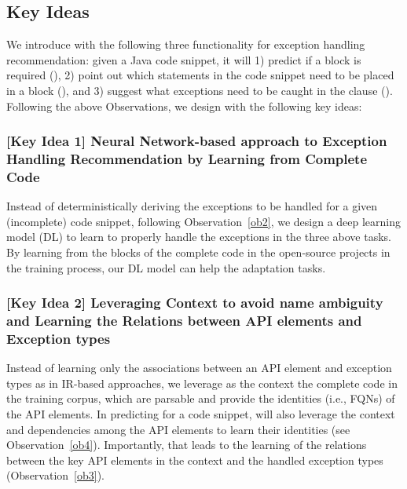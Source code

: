 \subsection{Key Ideas}
\label{key:sec}

We introduce {\tool} with the following three functionality for
exception handling recommendation: given a Java code snippet, it will
1) predict if a  block is required ({\xblock}), 2)
point out which statements in the code snippet need to be placed in a
 block ({\xstate}), and 3) suggest what exceptions
need to be caught in the  clause ({\xtype}). Following the
above Observations, we design {\tool} with the following key ideas:



\subsubsection{{\bf [Key Idea 1] Neural Network-based approach to Exception Handling Recommendation by Learning from Complete Code}}
Instead of deterministically deriving the exceptions to be handled for
a given (incomplete) code snippet, following Observation~\ref{ob2}, we
design a deep learning model (DL) to learn to properly handle the
exceptions in the three above tasks.
By learning from the  blocks of the complete code in
the open-source projects in the training process, our DL model can
help the adaptation tasks.




\vspace{2pt}
\subsubsection{{\bf [Key Idea 2] Leveraging Context to avoid
name ambiguity and Learning the Relations between API elements and
Exception types}} Instead of learning only the associations between an
API element and exception types as in IR-based approaches,
we leverage as the context the complete code in the training
corpus, which are parsable and provide the identities (i.e., FQNs) of
the API elements. In predicting for a code snippet, {\tool} will also
leverage the context and dependencies among the API elements to learn
their identities (see Observation~\ref{ob4}). Importantly,
that leads to the learning of the relations between the key API
elements in the context and the handled exception types
(Observation~\ref{ob3}).

